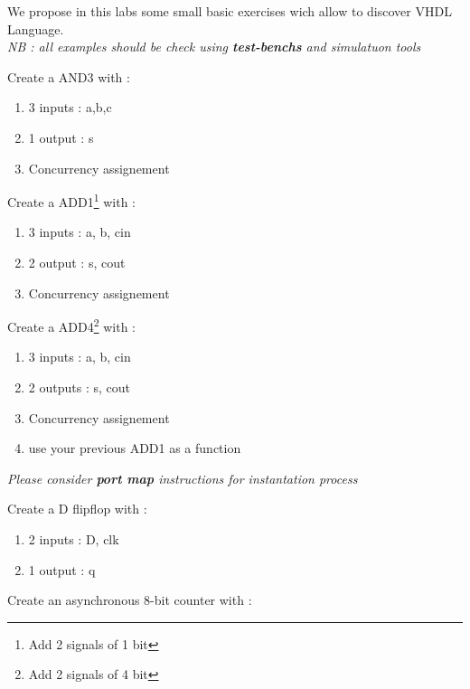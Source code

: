 \documentclass[12pt]{tdtp}
\begin{document}
\titre
We propose in this labs some small basic exercises wich allow to discover VHDL Language.\\

\textit {NB : all examples should be check using \textbf{test-benchs} and simulatuon tools}


\Exo

Create a AND3 with :

\begin{enumerate}
	\item 3 inputs : a,b,c
	\item 1 output : s
	\item Concurrency assignement 
\end{enumerate}


\Exo

Create a ADD1\footnote{Add 2 signals of 1 bit} with :

\begin{enumerate}
	\item 3 inputs : a, b, cin
	\item 2 output : s, cout
	\item Concurrency assignement 
\end{enumerate}


\Exo 

Create a ADD4\footnote{Add 2 signals of 4 bit} with : 

\begin{enumerate}
	\item 3 inputs : a, b, cin
	\item 2 outputs : s, cout
	\item Concurrency assignement 
	\item use your previous ADD1 as a function
\end{enumerate}

\textit{Please consider \textbf{port map} instructions for instantation process}

\Exo


Create a D flipflop  with : 

\begin{enumerate}
	\item 2 inputs : D, clk
	\item 1 output : q
\end{enumerate}

\Exo


Create an asynchronous 8-bit counter with : 
\end{document}

